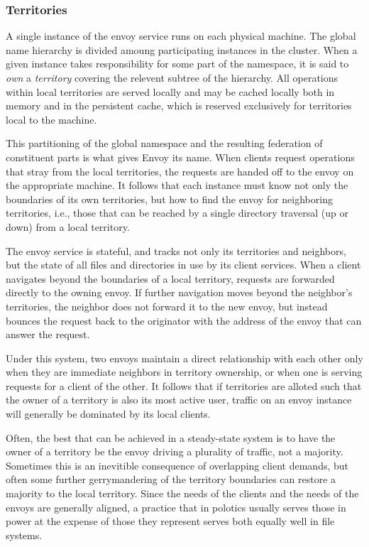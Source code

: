 \subsubsection{Territories}

A single instance of the envoy service runs on each physical machine. The global name hierarchy is divided amoung participating instances in the cluster. When a given instance takes responsibility for some part of the namespace, it is said to \emph{own} a \emph{territory} covering the relevent subtree of the hierarchy. All operations within local territories are served locally and may be cached locally both in memory and in the persistent cache, which is reserved exclusively for territories local to the machine.

This partitioning of the global namespace and the resulting federation of constituent parts is what gives Envoy its name. When clients request operations that stray from the local territories, the requests are handed off to the envoy on the appropriate machine. It follows that each instance must know not only the boundaries of its own territories, but how to find the envoy for neighboring territories, i.e., those that can be reached by a single directory traversal (up or down) from a local territory.

The envoy service is stateful, and tracks not only its territories and neighbors, but the state of all files and directories in use by its client services. When a client navigates beyond the boundaries of a local territory, requests are forwarded directly to the owning envoy. If further navigation moves beyond the neighbor's territories, the neighbor does not forward it to the new envoy, but instead bounces the request back to the originator with the address of the envoy that can answer the request.

Under this system, two envoys maintain a direct relationship with each other only when they are immediate neighbors in territory ownership, or when one is serving requests for a client of the other. It follows that if territories are alloted such that the owner of a territory is also its most active user, traffic on an envoy instance will generally be dominated by its local clients.

Often, the best that can be achieved in a steady-state system is to have the owner of a territory be the envoy driving a plurality of traffic, not a majority. Sometimes this is an inevitible consequence of overlapping client demands, but often some further gerrymandering of the territory boundaries can restore a majority to the local territory. Since the needs of the clients and the needs of the envoys are generally aligned, a practice that in polotics usually serves those in power at the expense of those they represent serves both equally well in file systems.

